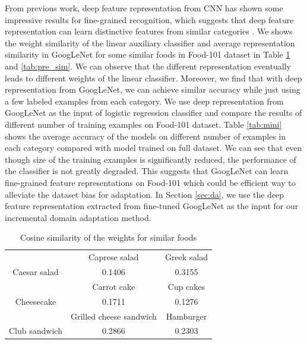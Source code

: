 From previous work, deep feature representation from CNN has shown some impressive results for fine-grained recognition, which suggests that deep feature representation can learn distinctive features from similar categories \cite{zhang2014part} \cite{razavian2014cnn}. We shows the weight similarity of the linear auxiliary classifier and average representation similarity in GoogLeNet for some similar foods in Food-101 dataset in Table \ref{tab:weight_sim} and \ref{tab:pre_sim}. We can observe that the different representation eventually leads to different weights of the linear classifier. 
Moreover, we find that with deep representation from GoogLeNet, we can achieve similar accuracy while just using a few labeled examples from each category.
We use deep representation from GoogLeNet as the input of logistic regression classifier and compare the results of different number of training examples on Food-101 dataset.
Table \ref{tab:mini} shows the average accuracy of the models on different number of examples in each category compared with model trained on full dataset. We can see that even though size of the training examples is significantly reduced, the performance of the classifier is not greatly degraded.
This suggests that GoogLeNet can learn fine-grained feature representations on Food-101 which could be efficient way to alleviate the dataset bias for adaptation. In Section \ref{sec:da}, we use the deep feature representation extracted from fine-tuned GoogLeNet as the input for our incremental domain adaptation method.
\begin{table}[htbp]
  \centering
  \caption{Cosine similarity of the weights for similar foods}
    \begin{tabular}{c|c|c}
    \toprule
          & Caprese salad & Greek salad \\
    Caesar salad & 0.1406 & 0.3155 \\
    \toprule
          & Carrot cake & Cup cakes \\
    Cheesecake & 0.1711 & 0.1276 \\
    \toprule
          & Grilled cheese sandwich & Hamburger \\
    Club sandwich & 0.2866 & 0.2303 \\
    \bottomrule
    \end{tabular}%
  \label{tab:weight_sim}%
\end{table}%
